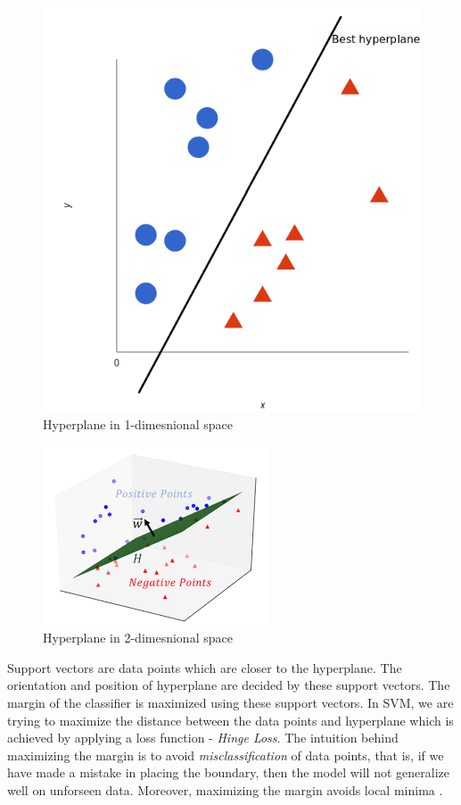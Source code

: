 \documentclass[format=sigconf]{acmart}
\begin{document}
\begin{figure}[H]
    \centering
    \includegraphics[scale=0.25]{images/svm_hyperplane_1.png}
    \caption{Hyperplane in 1-dimesnional space}
    \label{fig:svm_hyperplane_1}
\end{figure}
\begin{figure}[H]
    \centering
    \includegraphics[scale=0.60]{images/svm_hyperplane_2.png}
    \caption{Hyperplane in 2-dimesnional space}
    \label{fig:svm_hyperplane_2}
\end{figure}

Support vectors are data points which are closer to the hyperplane. The orientation and position of hyperplane are decided by 
these support vectors. The margin of the classifier is maximized using these support vectors. In SVM, we are trying to maximize 
the distance between the data points and hyperplane which is achieved by applying a loss function - \textit{Hinge Loss}. The intuition
behind maximizing the margin is to avoid \textit{misclassification} of data points, that is, if we have made a mistake in placing 
the boundary, then the model will not generalize well on unforseen data. Moreover, maximizing the margin avoids local minima
\cite{jakkula2006tutorial}. 
\end{document}
